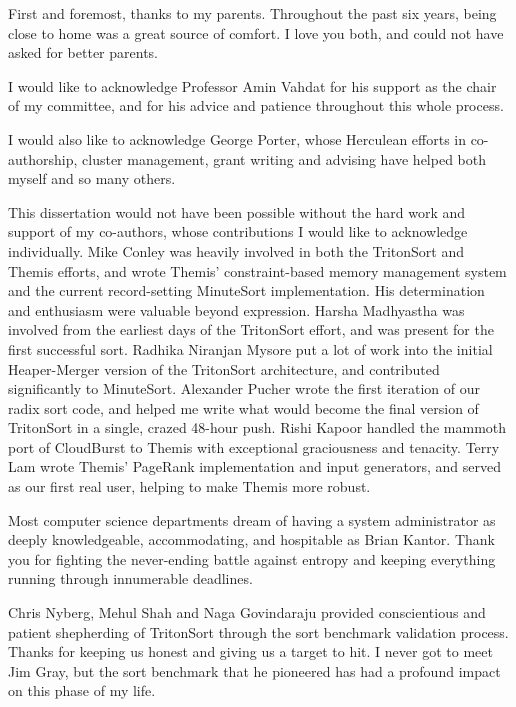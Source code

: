 \begin{acknowledgements}

First and foremost, thanks to my parents. Throughout the past six years, being
close to home was a great source of comfort. I love you both, and could not
have asked for better parents.

I would like to acknowledge Professor Amin Vahdat for his support as the chair
of my committee, and for his advice and patience throughout this whole
process.

I would also like to acknowledge George Porter, whose Herculean efforts in
co-authorship, cluster management, grant writing and advising have helped
both myself and so many others.

This dissertation would not have been possible without the hard work and
support of my co-authors, whose contributions I would like to acknowledge
individually. Mike Conley was heavily involved in both the TritonSort and
Themis efforts, and wrote Themis' constraint-based memory management system and
the current record-setting MinuteSort implementation. His determination and
enthusiasm were valuable beyond expression.  Harsha Madhyastha was involved
from the earliest days of the TritonSort effort, and was present for the first
successful sort. Radhika Niranjan Mysore put a lot of work into the initial
Heaper-Merger version of the TritonSort architecture, and contributed
significantly to MinuteSort. Alexander Pucher wrote the first iteration of our
radix sort code, and helped me write what would become the final version of
TritonSort in a single, crazed 48-hour push. Rishi Kapoor handled the mammoth
port of CloudBurst to Themis with exceptional graciousness and tenacity. Terry
Lam wrote Themis' PageRank implementation and input generators, and served as
our first real user, helping to make Themis more robust.

Most computer science departments dream of having a system administrator as
deeply knowledgeable, accommodating, and hospitable as Brian Kantor. Thank you
for fighting the never-ending battle against entropy and keeping everything
running through innumerable deadlines.

Chris Nyberg, Mehul Shah and Naga Govindaraju provided conscientious and
patient shepherding of TritonSort through the sort benchmark validation
process. Thanks for keeping us honest and giving us a target to hit. I never
got to meet Jim Gray, but the sort benchmark that he pioneered has had a
profound impact on this phase of my life.


\end{acknowledgements}
